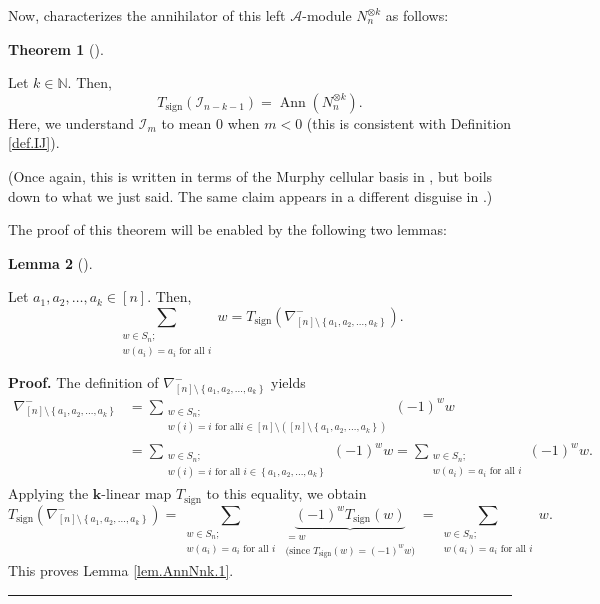 \documentclass[numbers=enddot,12pt,final,onecolumn,notitlepage]{scrartcl}%
\numberwithin{exer}{subsection}
\theoremstyle{definition}
\newtheorem{theo}{Theorem}[subsection]
\newenvironment{theorem}[1][]
{\begin{theo}[#1]\begin{leftbar}}
{\end{leftbar}\end{theo}}
\newtheorem{lem}[theo]{Lemma}
\newenvironment{lemma}[1][]
{\begin{lem}[#1]\begin{leftbar}}
{\end{leftbar}\end{lem}}
\newenvironment{proof}[1][Proof]{\noindent\textbf{#1.} }{\ \rule{0.5em}{0.5em}}
\let\sumnonlimits\sum
\renewcommand{\sum}{\sumnonlimits\limits}
\begin{document}
Now, \cite[Theorem 7.4 (a)]{BoDoMa18} characterizes the annihilator of this
left $\mathcal{A}$-module $N_{n}^{\otimes k}$ as follows:


\begin{theorem}
\label{thm.AnnNnk}Let $k\in\mathbb{N}$. Then,%
\[
T_{\operatorname*{sign}}\left(  \mathcal{I}_{n-k-1}\right)
=\operatorname*{Ann}\left(  N_{n}^{\otimes k}\right)  .
\]
Here, we understand $\mathcal{I}_{m}$ to mean $0$ when $m<0$ (this is
consistent with Definition \ref{def.IJ}).
\end{theorem}


(Once again, this is written in terms of the Murphy cellular basis in
\cite[Theorem 7.4 (a)]{BoDoMa18}, but boils down to what we just said. The
same claim appears in a different disguise in \cite[Example 2.13]{Donkin24}.)

The proof of this theorem will be enabled by the following two lemmas:

\begin{lemma}
\label{lem.AnnNnk.1}Let $a_{1},a_{2},\ldots,a_{k}\in\left[  n\right]  $. Then,%
\[
\sum_{\substack{w\in S_{n};\\w\left(  a_{i}\right)  =a_{i}\text{ for all }%
i}}w=T_{\operatorname*{sign}}\left(  \nabla_{\left[  n\right]  \setminus
\left\{  a_{1},a_{2},\ldots,a_{k}\right\}  }^{-}\right)  .
\]

\end{lemma}

\begin{proof}
The definition of $\nabla_{\left[  n\right]  \setminus\left\{  a_{1}%
,a_{2},\ldots,a_{k}\right\}  }^{-}$ yields%
\begin{align*}
\nabla_{\left[  n\right]  \setminus\left\{  a_{1},a_{2},\ldots,a_{k}\right\}
}^{-}  &  =\sum_{\substack{w\in S_{n};\\w\left(  i\right)  =i\text{ for all
}i\in\left[  n\right]  \setminus\left(  \left[  n\right]  \setminus\left\{
a_{1},a_{2},\ldots,a_{k}\right\}  \right)  }}\left(  -1\right)  ^{w}w\\
&  =\sum_{\substack{w\in S_{n};\\w\left(  i\right)  =i\text{ for all }%
i\in\left\{  a_{1},a_{2},\ldots,a_{k}\right\}  }}\left(  -1\right)  ^{w}%
w=\sum_{\substack{w\in S_{n};\\w\left(  a_{i}\right)  =a_{i}\text{ for all }%
i}}\left(  -1\right)  ^{w}w.
\end{align*}
Applying the $\mathbf{k}$-linear map $T_{\operatorname*{sign}}$ to this
equality, we obtain%
\[
T_{\operatorname*{sign}}\left(  \nabla_{\left[  n\right]  \setminus\left\{
a_{1},a_{2},\ldots,a_{k}\right\}  }^{-}\right)  =\sum_{\substack{w\in
S_{n};\\w\left(  a_{i}\right)  =a_{i}\text{ for all }i}}\underbrace{\left(
-1\right)  ^{w}T_{\operatorname*{sign}}\left(  w\right)  }%
_{\substack{=w\\\text{(since }T_{\operatorname*{sign}}\left(  w\right)
=\left(  -1\right)  ^{w}w\text{)}}}=\sum_{\substack{w\in S_{n};\\w\left(
a_{i}\right)  =a_{i}\text{ for all }i}}w.
\]
This proves Lemma \ref{lem.AnnNnk.1}.
\end{proof}
\end{document}
